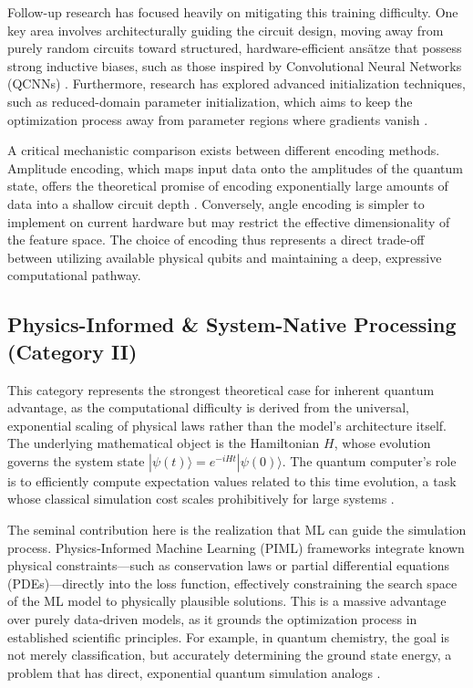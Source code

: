 \documentclass{article}
\begin{document}
Follow-up research has focused heavily on mitigating this training difficulty. One key area involves architecturally guiding the circuit design, moving away from purely random circuits toward structured, hardware-efficient ansätze that possess strong inductive biases, such as those inspired by Convolutional Neural Networks (QCNNs) \cite{chen2022quantum}. Furthermore, research has explored advanced initialization techniques, such as reduced-domain parameter initialization, which aims to keep the optimization process away from parameter regions where gradients vanish \cite{wang2024trainability}.

A critical mechanistic comparison exists between different encoding methods. Amplitude encoding, which maps input data onto the amplitudes of the quantum state, offers the theoretical promise of encoding exponentially large amounts of data into a shallow circuit depth \cite{shukla2024efficient}. Conversely, angle encoding is simpler to implement on current hardware but may restrict the effective dimensionality of the feature space. The choice of encoding thus represents a direct trade-off between utilizing available physical qubits and maintaining a deep, expressive computational pathway.

\subsection{Physics-Informed \& System-Native Processing (Category II)}

\label{sec:physics\_informed\_system\_native\_processin}

This category represents the strongest theoretical case for inherent quantum advantage, as the computational difficulty is derived from the universal, exponential scaling of physical laws rather than the model's architecture itself. The underlying mathematical object is the Hamiltonian $H$, whose evolution governs the system state $|\psi(t)\rangle = e^{-iHt}|\psi(0)\rangle$. The quantum computer's role is to efficiently compute expectation values related to this time evolution, a task whose classical simulation cost scales prohibitively for large systems \cite{kuhne2020electronic}.

The seminal contribution here is the realization that ML can guide the simulation process. Physics-Informed Machine Learning (PIML) frameworks \cite{karniadakis2021physicsinformed} integrate known physical constraints---such as conservation laws or partial differential equations (PDEs)---directly into the loss function, effectively constraining the search space of the ML model to physically plausible solutions. This is a massive advantage over purely data-driven models, as it grounds the optimization process in established scientific principles. For example, in quantum chemistry, the goal is not merely classification, but accurately determining the ground state energy, a problem that has direct, exponential quantum simulation analogs \cite{barca2020recent}.
\end{document}
